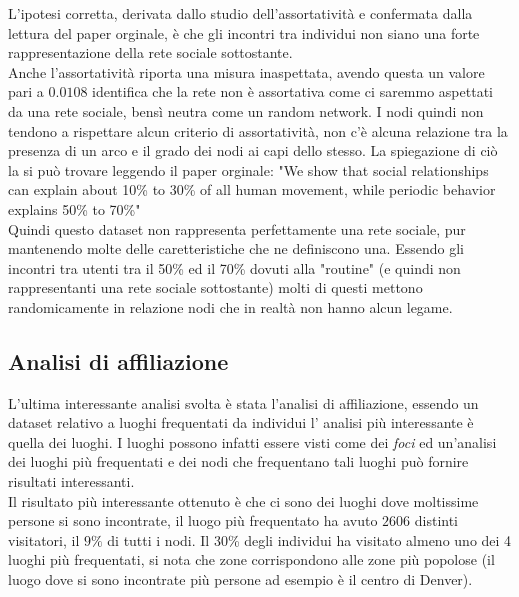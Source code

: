 \documentclass[a4paper]{article}
\begin{document}
L'ipotesi corretta, derivata dallo studio dell'assortatività e confermata dalla lettura del paper orginale, è che gli incontri tra individui non siano una forte rappresentazione della rete sociale sottostante.\\
Anche l'assortatività riporta una misura inaspettata, avendo questa un valore pari a $0.0108$ identifica che la rete non è assortativa come ci saremmo aspettati da una rete sociale, bensì neutra come un random network.
I nodi quindi non tendono a rispettare alcun criterio di assortatività, non c'è alcuna relazione tra la presenza di un arco e il grado dei nodi ai capi dello stesso.
La spiegazione di ciò la si può trovare leggendo il paper orginale: 
"We show that social relationships can explain about 10\% to 30\% of all human movement, while periodic behavior explains 50\% to 70\%"\cite{original_paper}\\
Quindi questo dataset non rappresenta perfettamente una rete sociale, pur mantenendo molte delle caretteristiche che ne definiscono una.
Essendo gli incontri tra utenti tra il 50\% ed il 70\% dovuti alla "routine" (e quindi non rappresentanti una rete sociale sottostante) molti di questi mettono randomicamente in relazione nodi che in realtà non hanno alcun legame.
\subsection{Analisi di affiliazione}
L'ultima interessante analisi svolta è stata l'analisi di affiliazione, essendo un dataset relativo a luoghi frequentati da individui l' analisi più interessante è quella dei luoghi.
I luoghi possono infatti essere visti come dei \textit{foci} ed un'analisi dei luoghi più frequentati e dei nodi che frequentano tali luoghi può fornire risultati interessanti.\\
Il risultato più interessante ottenuto è che ci sono dei luoghi dove moltissime persone si sono incontrate, il luogo più frequentato ha avuto $2606$ distinti visitatori, il $9\%$ di tutti i nodi. Il 30\% degli individui ha visitato almeno uno dei 4 luoghi più frequentati, si nota che zone corrispondono alle zone più popolose (il luogo dove si sono incontrate più persone ad esempio è il centro di Denver).
\end{document}
